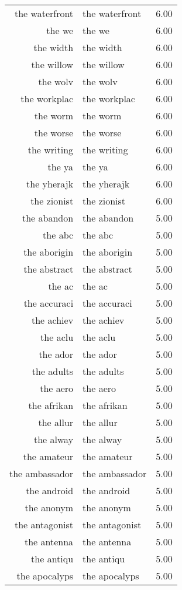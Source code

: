\begin{table}[ht]
\begin{tabular}{rlr}
  the waterfront & the waterfront & 6.00 \\ 
  the we & the we & 6.00 \\ 
  the width & the width & 6.00 \\ 
  the willow & the willow & 6.00 \\ 
  the wolv & the wolv & 6.00 \\ 
  the workplac & the workplac & 6.00 \\ 
  the worm & the worm & 6.00 \\ 
  the worse & the worse & 6.00 \\ 
  the writing & the writing & 6.00 \\ 
  the ya & the ya & 6.00 \\ 
  the yherajk & the yherajk & 6.00 \\ 
  the zionist & the zionist & 6.00 \\ 
  the abandon & the abandon & 5.00 \\ 
  the abc & the abc & 5.00 \\ 
  the aborigin & the aborigin & 5.00 \\ 
  the abstract & the abstract & 5.00 \\ 
  the ac & the ac & 5.00 \\ 
  the accuraci & the accuraci & 5.00 \\ 
  the achiev & the achiev & 5.00 \\ 
  the aclu & the aclu & 5.00 \\ 
  the ador & the ador & 5.00 \\ 
  the adults & the adults & 5.00 \\ 
  the aero & the aero & 5.00 \\ 
  the afrikan & the afrikan & 5.00 \\ 
  the allur & the allur & 5.00 \\ 
  the alway & the alway & 5.00 \\ 
  the amateur & the amateur & 5.00 \\ 
  the ambassador & the ambassador & 5.00 \\ 
  the android & the android & 5.00 \\ 
  the anonym & the anonym & 5.00 \\ 
  the antagonist & the antagonist & 5.00 \\ 
  the antenna & the antenna & 5.00 \\ 
  the antiqu & the antiqu & 5.00 \\ 
  the apocalyps & the apocalyps & 5.00 \\ 

\end{tabular}
\end{table}
